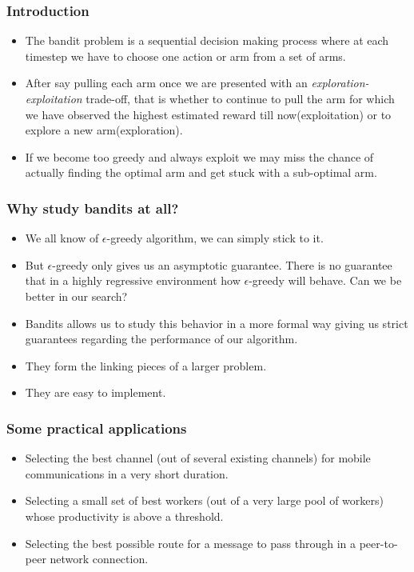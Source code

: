 \begin{frame}
\frametitle{Introduction}
\begin{itemize}
\item<1-> The bandit problem is a sequential decision making process where at each timestep we have to choose one action or arm from a set of arms. 
\item<2-> After say pulling each arm once we are presented with an \emph{exploration-exploitation}  trade-off, that is whether to continue to pull the arm for which we have observed the highest estimated reward till now(exploitation) or to explore a new arm(exploration). 
\item<3-> If we become too greedy and always exploit we may miss the chance of actually finding the optimal arm and get stuck with a sub-optimal arm.
\end{itemize}
\end{frame}

\begin{frame}
\frametitle{Why study bandits at all?}
\begin{itemize}
\item<1-> We all know of $\epsilon$-greedy \cite{sutton1998reinforcement} algorithm, we can simply stick to it.
\item<2-> But $\epsilon$-greedy only gives us an asymptotic guarantee. There is no guarantee that in a highly regressive environment how $\epsilon$-greedy will behave. Can we be better in our search?
\item<3-> Bandits allows us to study this behavior in a more formal way giving us strict guarantees regarding the performance of our algorithm.
\item<4-> They form the linking pieces of a larger problem.
\item<5-> They are easy to implement.    
\end{itemize}
\end{frame}

\begin{frame}
\frametitle{Some practical applications}
\begin{itemize}
\item<1-> Selecting the best channel (out of several existing channels) for mobile communications in a very short duration.
\item<2-> Selecting a small set of best workers (out of a very large pool of workers) whose productivity is above a threshold.
\item<3-> Selecting the best possible route for a message to pass through in a peer-to-peer network connection.
\end{itemize}
\end{frame}
